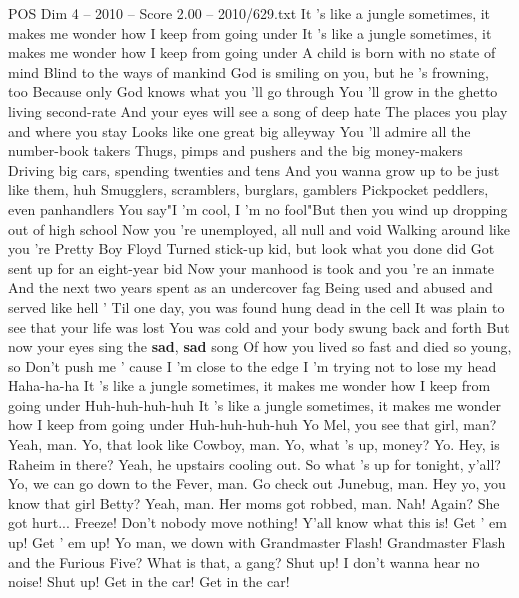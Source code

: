 \begin{textsample}{POS Dim 4 – 2010 – Score 2.00 – 2010/629.txt}
It 's like a jungle sometimes, it makes me wonder how I keep from going under It 's like a jungle sometimes, it makes me wonder how I keep from going under A child is born with no state of mind Blind to the ways of mankind God is smiling on you, but he 's frowning, too Because only God knows what you 'll go through You 'll grow in the ghetto living second-rate And your eyes will see a song of deep hate The places you play and where you stay Looks like one great big alleyway You 'll admire all the number-book takers Thugs, pimps and pushers and the big money-makers Driving big cars, spending twenties and tens And you wanna grow up to be just like them, huh Smugglers, scramblers, burglars, gamblers Pickpocket peddlers, even panhandlers You say"I 'm cool, I 'm no fool"But then you wind up dropping out of high school Now you 're unemployed, all null and void Walking around like you 're Pretty Boy Floyd Turned stick-up kid, but look what you done did Got sent up for an eight-year bid Now your manhood is took and you 're an inmate And the next two years spent as an undercover fag Being used and abused and served like hell ' Til one day, you was found hung dead in the cell It was plain to see that your life was lost You was cold and your body swung back and forth But now your eyes sing the \textbf{sad}, \textbf{sad} song Of how you lived so fast and died so young, so Don't push me ' cause I 'm close to the edge I 'm trying not to lose my head Haha-ha-ha It 's like a jungle sometimes, it makes me wonder how I keep from going under Huh-huh-huh-huh It 's like a jungle sometimes, it makes me wonder how I keep from going under Huh-huh-huh-huh Yo Mel, you see that girl, man?
Yeah, man.
Yo, that look like Cowboy, man.
Yo, what 's up, money?
Yo.
Hey, is Raheim in there?
Yeah, he upstairs cooling out.
So what 's up for tonight, y'all?
Yo, we can go down to the Fever, man.
Go check out Junebug, man.
Hey yo, you know that girl Betty?
Yeah, man.
Her moms got robbed, man.
Nah!
Again?
She got hurt...
Freeze!
Don't nobody move nothing!
Y'all know what this is!
Get ' em up!
Get ' em up!
Yo man, we down with Grandmaster Flash!
Grandmaster Flash and the Furious Five?
What is that, a gang?
Shut up!
I don't wanna hear no noise!
Shut up!
Get in the car!
Get in the car!

\end{textsample}
